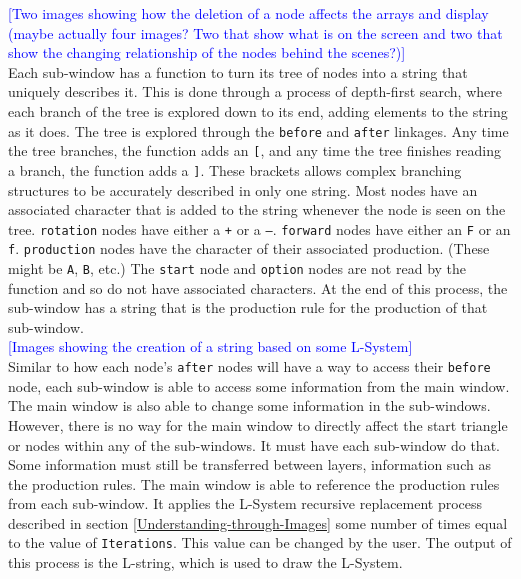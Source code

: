 \documentclass[12pt,twoside]{reedthesis}
\newcommand{\code}[1]{\texttt{#1}}
\begin{document}
	\textcolor{blue}{[Two images showing how the deletion of a node affects the arrays and display (maybe actually four images? Two that show what is on the screen and two that show the changing relationship of the nodes behind the scenes?)]}\\
	
	 Each sub-window has a function to turn its tree of nodes into a string that uniquely describes it. This is done through a process of depth-first search, where each branch of the tree is explored down to its end, adding elements to the string as it does. The tree is explored through the \code{before} and \code{after} linkages. Any time the tree branches, the function adds an \code{[}, and any time the tree finishes reading a branch, the function adds a \code{]}. These brackets allows complex branching structures to be accurately described in only one string. Most nodes have an associated character that is added to the string whenever the node is seen on the tree. \code{rotation} nodes have either a \code{+} or a \code{–}. \code{forward} nodes have either an \code{F} or an \code{f}. \code{production} nodes have the character of their associated production. (These might be \code{A}, \code{B}, etc.) The \code{start} node and \code{option} nodes are not read by the function and so do not have associated characters. At the end of this process, the sub-window has a string that is the production rule for the production of that sub-window.\\
	 
	 \textcolor{blue}{[Images showing the creation of a string based on some L-System]}\\
	
	Similar to how each node's \code{after} nodes will have a way to access their \code{before} node, each sub-window is able to access some information from the main window. The main window is also able to change some information in the sub-windows. However, there is no way for the main window to directly affect the start triangle or nodes within any of the sub-windows. It must have each sub-window do that. Some information must still be transferred between layers, information such as the production rules. The main window is able to reference the production rules from each sub-window. It applies the L-System recursive replacement process described in section \ref{Understanding-through-Images} some number of times equal to the value of \code{Iterations}. This value can be changed by the user. The output of this process is the L-string, which is used to draw the L-System.\\
	
\end{document}
